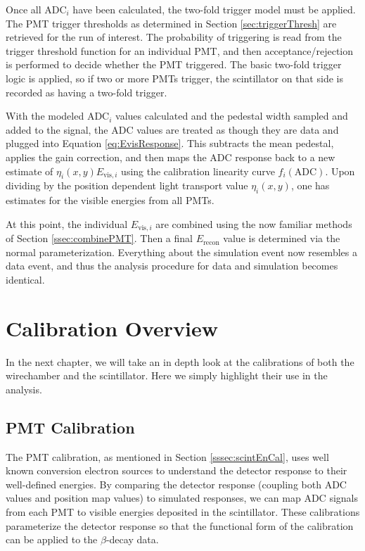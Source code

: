 Once all $\mathrm{ADC}_i$ have been calculated, the two-fold trigger model must be applied.
The PMT trigger thresholds as determined in Section \ref{sec:triggerThresh} are retrieved for the run of interest.
The probability of triggering is read from the trigger threshold function for an individual PMT, and then
acceptance/rejection is performed to decide whether the PMT triggered. The basic two-fold trigger logic is
applied, so if two or more PMTs trigger, the scintillator on that side is recorded as having a two-fold trigger.

With the modeled $\mathrm{ADC}_i$ values calculated and the pedestal width sampled and added to the signal, the ADC values
are treated as though they are data and plugged into Equation \ref{eq:EvisResponse}. This subtracts the mean pedestal,
applies the gain correction, and then maps the ADC response back to a new estimate of $\eta_i(x,y) E_{\mathrm{vis},i}$
using the calibration linearity curve $f_i(\mathrm{ADC})$. Upon dividing by the position dependent light transport
value $\eta_i(x,y)$, one has estimates for the visible energies from all PMTs.

At this point, the individual $E_{\mathrm{vis},i}$ are combined using the now familiar methods of Section \ref{ssec:combinePMT}.
Then a final $E_{\mathrm{recon}}$ value is determined via the normal parameterization. Everything about the simulation event
now resembles a data event, and thus the analysis procedure for data and simulation becomes identical.






\section{Calibration Overview}

In the next chapter, we will take an in depth look at the calibrations of both
the wirechamber and the scintillator. Here we simply highlight their use in the analysis.

\subsection{PMT Calibration} \label{ssec:PMTCal}

The PMT calibration, as mentioned in Section \ref{sssec:scintEnCal},
uses well known conversion electron sources
to understand the detector response to their well-defined energies. By comparing the detector
response (coupling both ADC values and position map values) to simulated responses,
we can map ADC signals from each PMT to visible energies deposited
in the scintillator. These calibrations parameterize the detector response so that the
functional form of the calibration can be applied to the $\beta$-decay data.

